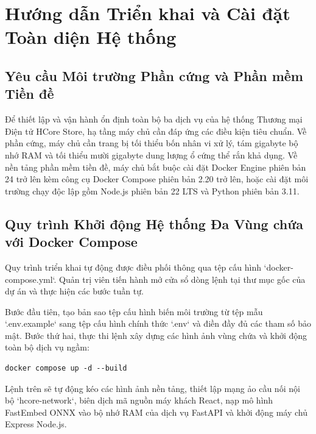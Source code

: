 \documentclass[12pt,a4paper]{report}
\begin{document}







\appendix

\chapter{Hướng dẫn Triển khai và Cài đặt Toàn diện Hệ thống}

\section{Yêu cầu Môi trường Phần cứng và Phần mềm Tiền đề}
Để thiết lập và vận hành ổn định toàn bộ ba dịch vụ của hệ thống Thương mại Điện tử HCore Store, hạ tầng máy chủ cần đáp ứng các điều kiện tiêu chuẩn. Về phần cứng, máy chủ cần trang bị tối thiểu bốn nhân vi xử lý, tám gigabyte bộ nhớ RAM và tối thiểu mười gigabyte dung lượng ổ cứng thể rắn khả dụng. Về nền tảng phần mềm tiền đề, máy chủ bắt buộc cài đặt Docker Engine phiên bản 24 trở lên kèm công cụ Docker Compose phiên bản 2.20 trở lên, hoặc cài đặt môi trường chạy độc lập gồm Node.js phiên bản 22 LTS và Python phiên bản 3.11.

\section{Quy trình Khởi động Hệ thống Đa Vùng chứa với Docker Compose}
Quy trình triển khai tự động được điều phối thông qua tệp cấu hình `docker-compose.yml`. Quản trị viên tiến hành mở cửa sổ dòng lệnh tại thư mục gốc của dự án và thực hiện các bước tuần tự.

Bước đầu tiên, tạo bản sao tệp cấu hình biến môi trường từ tệp mẫu `.env.example` sang tệp cấu hình chính thức `.env` và điền đầy đủ các tham số bảo mật. Bước thứ hai, thực thi lệnh xây dựng các hình ảnh vùng chứa và khởi động toàn bộ dịch vụ ngầm:
\begin{verbatim}
docker compose up -d --build
\end{verbatim}

Lệnh trên sẽ tự động kéo các hình ảnh nền tảng, thiết lập mạng ảo cầu nối nội bộ `hcore-network`, biên dịch mã nguồn máy khách React, nạp mô hình FastEmbed ONNX vào bộ nhớ RAM của dịch vụ FastAPI và khởi động máy chủ Express Node.js.
\end{document}
